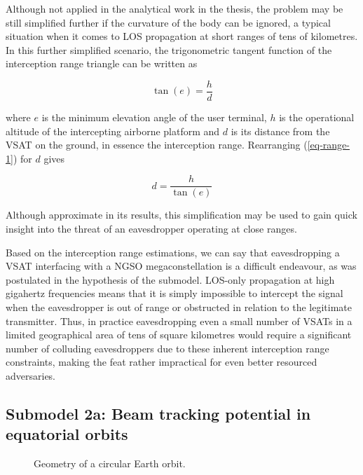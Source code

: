 \documentclass[english, 12pt, a4paper, elec, utf8, a-1b, online]{aaltothesis}
\begin{document}
Although not applied in the analytical work in the thesis, the problem may be still simplified further if the curvature of the body can be ignored, a typical situation when it comes to LOS propagation at short ranges of tens of kilometres.
In this further simplified scenario, the trigonometric tangent function of the interception range triangle can be written as

\begin{equation} \label{eq-range-1}
  \tan(e) = \frac{h}{d}
\end{equation}

\noindent
where $e$ is the minimum elevation angle of the user terminal, $h$ is the operational altitude of the intercepting airborne platform and $d$ is its distance from the VSAT on the ground, in essence the interception range.
Rearranging (\ref{eq-range-1}) for $d$ gives

\begin{equation} \label{eq-range-2}
  d = \frac{h}{\tan(e)}
\end{equation}

Although approximate in its results, this simplification may be used to gain quick insight into the threat of an eavesdropper operating at close ranges.

Based on the interception range estimations, we can say that eavesdropping a VSAT interfacing with a NGSO megaconstellation is a difficult endeavour, as was postulated in the hypothesis of the submodel.
LOS-only propagation at high gigahertz frequencies means that it is simply impossible to intercept the signal when the eavesdropper is out of range or obstructed in relation to the legitimate transmitter.
Thus, in practice eavesdropping even a small number of VSATs in a limited geographical area of tens of square kilometres would require a significant number of colluding eavesdroppers due to these inherent interception range constraints, making the feat rather impractical for even better resourced adversaries.

\subsection{Submodel 2a: Beam tracking potential in equatorial orbits} \label{ch-results-submodel-2a-tracking-equatorial}

\begin{figure}[h]
  \centering
  
  \caption{Geometry of a circular Earth orbit.}
  \label{fig-orbit-geometry}
\end{figure}
\end{document}
